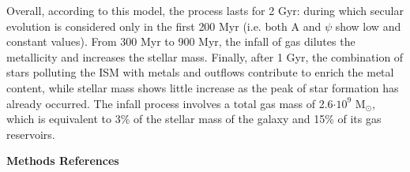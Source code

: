 \documentclass{nature2}
\begin{document}
Overall, according to this model, the process lasts for 2 Gyr: during which secular evolution is considered only in the first 200 Myr (i.e. both A and \ensuremath{\psi} show low and constant values). From 300 Myr to 900 Myr, the infall of gas dilutes the metallicity and increases the stellar mass. Finally, after 1 Gyr, the combination of stars polluting the ISM with metals and outflows contribute to enrich the metal content, while stellar mass shows little increase as the peak of star formation has already occurred. The infall process involves a total gas mass of 2.6\ensuremath{\cdot 10^{9}} M\ensuremath{_{\odot }}, which is equivalent to 3\% of the stellar mass of the galaxy and 15\% of its gas reservoirs.


\clearpage

\begin{center}
\bf{\large Methods References}
\label{M_Ref}
\end{center}
\end{document}
